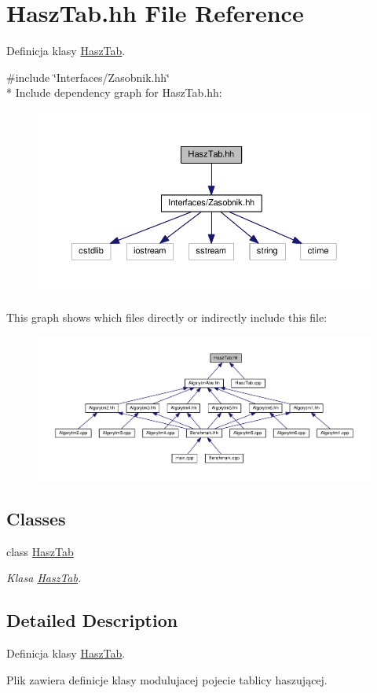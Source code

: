 \hypertarget{a00044}{}\section{Hasz\+Tab.\+hh File Reference}
\label{a00044}


Definicja klasy \hyperlink{a00012}{Hasz\+Tab}.  


{\ttfamily \#include \char`\"{}Interfaces/\+Zasobnik.\+hh\char`\"{}}\\*
Include dependency graph for Hasz\+Tab.\+hh\+:
\nopagebreak
\begin{figure}[H]
\begin{center}
\leavevmode
\includegraphics[width=350pt]{a00095}
\end{center}
\end{figure}
This graph shows which files directly or indirectly include this file\+:
\nopagebreak
\begin{figure}[H]
\begin{center}
\leavevmode
\includegraphics[width=350pt]{a00096}
\end{center}
\end{figure}
\subsection*{Classes}
\begin{DoxyCompactItemize}
\item 
class \hyperlink{a00012}{Hasz\+Tab}
\begin{DoxyCompactList}\small\item\em Klasa \hyperlink{a00012}{Hasz\+Tab}. \end{DoxyCompactList}\end{DoxyCompactItemize}


\subsection{Detailed Description}
Definicja klasy \hyperlink{a00012}{Hasz\+Tab}. 

Plik zawiera definicje klasy modulujacej pojecie tablicy haszującej. 